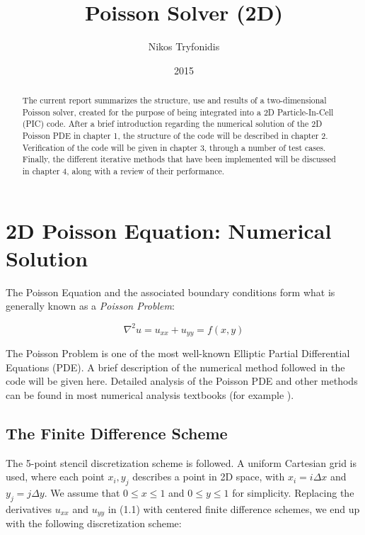 \documentclass[11pt]{report}
\begin{document}
\title{\textbf{Poisson Solver (2D)}}
\author{Nikos Tryfonidis}
\date{2015}

\maketitle

\begin{abstract}
The current report summarizes the structure, use and results of a two-dimensional Poisson solver, 
created for the purpose of being integrated into a 2D Particle-In-Cell (PIC) code. After a brief introduction 
regarding the numerical solution of the 2D Poisson PDE in chapter 1, the structure of the code will be 
described in chapter 2. Verification of the code will be given in chapter 3, through a number of test cases. 
Finally, the different iterative methods that have been implemented will be discussed in chapter 4, along with a review of their performance.
\end{abstract}

\tableofcontents

\chapter{2D Poisson Equation: Numerical Solution}
The Poisson Equation and the associated boundary conditions form what is generally known as a 
\emph{Poisson Problem}: 

\begin{equation}
\nabla ^2 u = u_{xx} + u_{yy} = f(x,y)
\end{equation}

The Poisson Problem is one of the most well-known Elliptic Partial Differential Equations (PDE). A brief description of the numerical method followed in the code will be given here. Detailed analysis of the Poisson PDE and other methods can be found in most numerical analysis textbooks (for example \cite{leveque}).

\section{The Finite Difference Scheme}
The 5-point stencil discretization scheme is followed. A uniform Cartesian grid is used, where each point $x_i, y_j$ describes a point in 2D space, with $x_i = i\Delta x$ and $y_j = j\Delta y$. We assume that $0 \leq x \leq 1$ and $0 \leq y \leq 1$ for simplicity. Replacing the derivatives $u_{xx}$ and $u_{yy}$ in (1.1) with centered finite difference schemes, we end up with the following discretization scheme:
\end{document}
